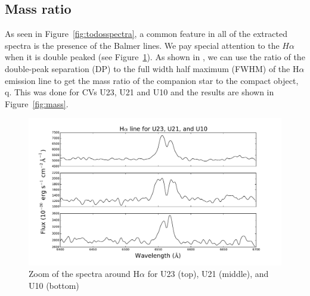 \subsection{Mass ratio}

As seen in Figure~\ref{fig:todosspectra}, a common feature in all of the extracted spectra is the presence of the Balmer lines. We pay special attention to the $H\alpha$ when it is double peaked (see Figure~\ref{fig:halphatodos}). As shown in \cite{casares_massration_20016}, we can use the ratio of the double-peak separation (DP) to the full width half maximum (FWHM) of the H$\alpha$ emission line to get the mass ratio of the companion star to the compact object, q. This was done for CVs U23, U21 and U10 and the results are shown in Figure~\ref{fig:mass}.

\begin{figure}[]
        \centering
        \includegraphics[scale=.5]{assets/images/todos.pdf}
        \caption[Zoom of spectra around H$\alpha$]{Zoom of the spectra around H$\alpha$ for U23 (top), U21 (middle), and U10 (bottom)}
\label{fig:halphatodos}
\end{figure}

